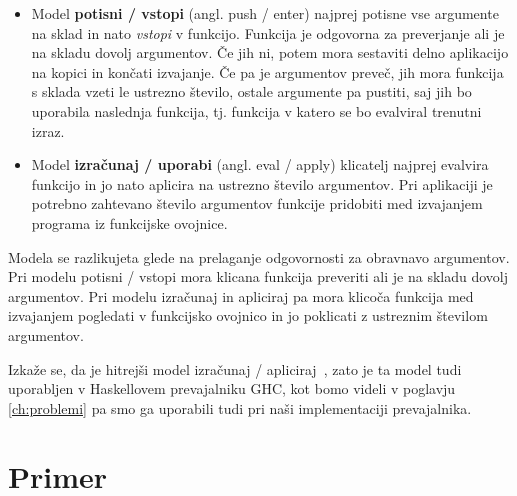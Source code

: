 \begin{itemize}
	\itemsep 0em
	\item Model \textbf{potisni / vstopi} (angl. push / enter) najprej potisne vse argumente na sklad in nato \textit{vstopi} v funkcijo. Funkcija je odgovorna za preverjanje ali je na skladu dovolj argumentov. Če jih ni, potem mora sestaviti delno aplikacijo na kopici in končati izvajanje. Če pa je argumentov preveč, jih mora funkcija s sklada vzeti le ustrezno število, ostale argumente pa pustiti, saj jih bo uporabila naslednja funkcija, tj. funkcija v katero se bo evalviral trenutni izraz.
	\item Model \textbf{izračunaj / uporabi} (angl. eval / apply) klicatelj najprej evalvira funkcijo in jo nato aplicira na ustrezno število argumentov. Pri aplikaciji je potrebno zahtevano število argumentov funkcije pridobiti med izvajanjem programa iz funkcijske ovojnice.
\end{itemize}

Modela se razlikujeta glede na prelaganje odgovornosti za obravnavo argumentov. Pri modelu potisni / vstopi mora klicana funkcija preveriti ali je na skladu dovolj argumentov. Pri modelu izračunaj in apliciraj pa mora klicoča funkcija med izvajanjem pogledati v funkcijsko ovojnico in jo poklicati z ustreznim številom argumentov.

Izkaže se, da je hitrejši model izračunaj / apliciraj~\cite{marlow2004making}, zato je ta model tudi uporabljen v Haskellovem prevajalniku GHC, kot bomo videli v poglavju \ref{ch:problemi} pa smo ga uporabili tudi pri naši implementaciji prevajalnika.


\section{Primer}
